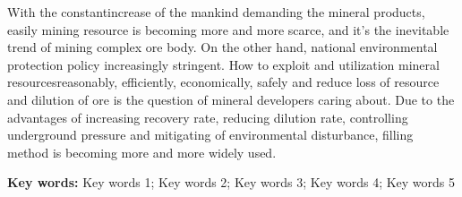 \xiaosi 

With the constantincrease of the mankind demanding the mineral products, easily mining resource is becoming more and more scarce, and it’s the inevitable trend of mining complex ore body. On the other hand, national environmental protection policy increasingly stringent. How to exploit and utilization mineral resourcesreasonably, efficiently, economically, safely and reduce loss of resource and dilution of ore is the question of mineral developers caring about. Due to the advantages of increasing recovery rate, reducing dilution rate, controlling underground pressure and mitigating of environmental disturbance, filling method is becoming more and more widely used.


    
\vspace{\baselineskip}
\noindent \xiaosi\textbf{ Key words:} \xiaosi Key words 1; Key words 2; Key words 3; Key words 4; Key words 5